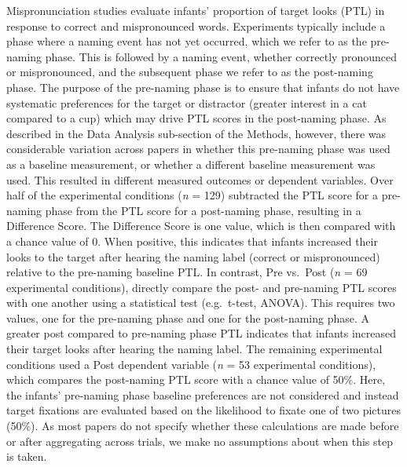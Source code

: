 \documentclass[man]{apa6}
\theoremstyle{definition}
\theoremstyle{definition}
\theoremstyle{definition}
\theoremstyle{remark}
\begin{document}
Mispronunciation studies evaluate infants' proportion of target looks
(PTL) in response to correct and mispronounced words. Experiments
typically include a phase where a naming event has not yet occurred,
which we refer to as the pre-naming phase. This is followed by a naming
event, whether correctly pronounced or mispronounced, and the subsequent
phase we refer to as the post-naming phase. The purpose of the
pre-naming phase is to ensure that infants do not have systematic
preferences for the target or distractor (greater interest in a cat
compared to a cup) which may drive PTL scores in the post-naming phase.
As described in the Data Analysis sub-section of the Methods, however,
there was considerable variation across papers in whether this
pre-naming phase was used as a baseline measurement, or whether a
different baseline measurement was used. This resulted in different
measured outcomes or dependent variables. Over half of the experimental
conditions (\emph{n} = 129) subtracted the PTL score for a pre-naming
phase from the PTL score for a post-naming phase, resulting in a
Difference Score. The Difference Score is one value, which is then
compared with a chance value of 0. When positive, this indicates that
infants increased their looks to the target after hearing the naming
label (correct or mispronounced) relative to the pre-naming baseline
PTL. In contrast, Pre vs.~Post (\emph{n} = 69 experimental conditions),
directly compare the post- and pre-naming PTL scores with one another
using a statistical test (e.g.~t-test, ANOVA). This requires two values,
one for the pre-naming phase and one for the post-naming phase. A
greater post compared to pre-naming phase PTL indicates that infants
increased their target looks after hearing the naming label. The
remaining experimental conditions used a Post dependent variable
(\emph{n} = 53 experimental conditions), which compares the post-naming
PTL score with a chance value of 50\%. Here, the infants' pre-naming
phase baseline preferences are not considered and instead target
fixations are evaluated based on the likelihood to fixate one of two
pictures (50\%). As most papers do not specify whether these
calculations are made before or after aggregating across trials, we make
no assumptions about when this step is taken.
\end{document}
